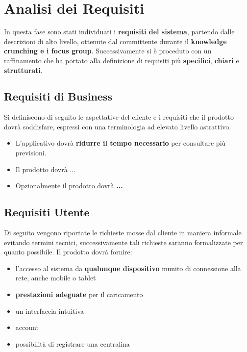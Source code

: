 

\chapter{Analisi dei Requisiti}
In questa fase sono stati individuati i \textbf{requisiti del sistema}, partendo dalle descrizioni di alto livello, ottenute dal committente durante il \textbf{knowledge crunching e i focus group}. Successivamente si è proceduto con un raffinamento che ha portato alla definizione di requisiti più \textbf{specifici}, \textbf{chiari} e \textbf{strutturati}.
	
	\section{Requisiti di Business}
	Si definiscono di seguito le aspettative del cliente e i requisiti che il prodotto dovrà soddisfare, espressi con una terminologia ad elevato livello astrattivo.
        \begin{itemize}
            \item L'applicativo dovrà \textbf{ridurre il tempo necessario} per consultare più previsioni.
            \item Il prodotto dovrà ...
            \item Opzionalmente il prodotto dovrà \textbf{...} 
        \end{itemize}
	
	\section{Requisiti Utente}
	Di seguito vengono riportate le richieste mosse dal cliente in maniera informale evitando termini tecnici, successivamente tali richieste saranno formalizzate per quanto possibile.
	Il prodotto dovrà fornire: 
		\begin{itemize}
            \item l'accesso al sistema da \textbf{qualunque dispositivo} munito di connessione alla rete, anche mobile o tablet
            \item \textbf{prestazioni adeguate} per il caricamento
            \item un interfaccia intuitiva
            \item account
            \item possibilità di registrare una centralina
        \end{itemize}
